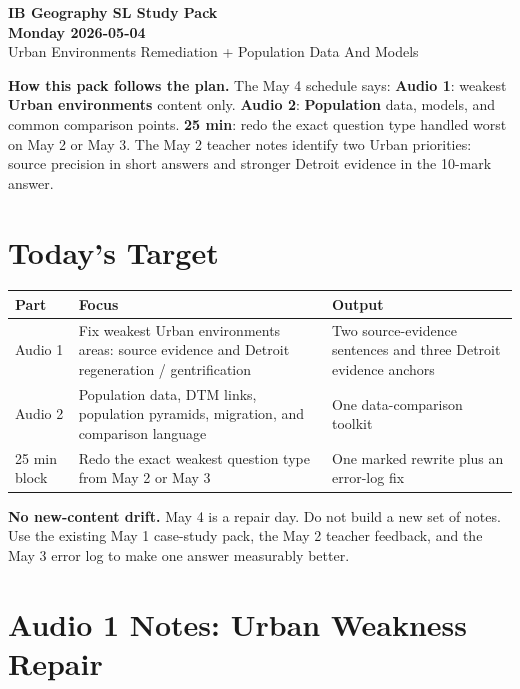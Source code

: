\documentclass[11pt,a4paper]{article}
\newcommand{\term}[1]{\textcolor{HeadingBlue}{\textbf{#1}}}
\newcommand{\boxnote}[3]{%
\noindent\colorbox{#1}{%
  \begin{minipage}{0.965\textwidth}
  \sffamily
  \textbf{\textcolor{HeadingBlue}{#2}} #3
  \end{minipage}
}}
\begin{document}
\begin{center}
  {\sffamily\bfseries\color{HeadingBlue}\LARGE IB Geography SL Study Pack}\\[0.25em]
  {\sffamily\bfseries\color{AccentTeal}\Large Monday 2026-05-04}\\[0.35em]
  {\sffamily\color{TextInk}Urban Environments Remediation + Population Data And Models}
\end{center}

\boxnote{SoftBlue}{How this pack follows the plan.}{The May 4 schedule says:
\term{Audio 1}: weakest \term{Urban environments} content only.
\term{Audio 2}: \term{Population} data, models, and common comparison points.
\term{25 min}: redo the exact question type handled worst on May 2 or May 3.
The May 2 teacher notes identify two Urban priorities: source precision in
short answers and stronger Detroit evidence in the 10-mark answer.}

\section{Today's Target}

\begin{tabularx}{\textwidth}{L{0.2\textwidth}Y L{0.25\textwidth}}
\toprule
\textbf{Part} & \textbf{Focus} & \textbf{Output} \\
\midrule
Audio 1 & Fix weakest Urban environments areas: source evidence and
Detroit regeneration / gentrification & Two source-evidence sentences and
three Detroit evidence anchors \\
Audio 2 & Population data, DTM links, population pyramids, migration, and
comparison language & One data-comparison toolkit \\
25 min block & Redo the exact weakest question type from May 2 or May 3 & One
marked rewrite plus an error-log fix \\
\bottomrule
\end{tabularx}

\boxnote{SoftRed}{No new-content drift.}{May 4 is a repair day. Do not build a
new set of notes. Use the existing May 1 case-study pack, the May 2 teacher
feedback, and the May 3 error log to make one answer measurably better.}

\section{Audio 1 Notes: Urban Weakness Repair}
\end{document}
